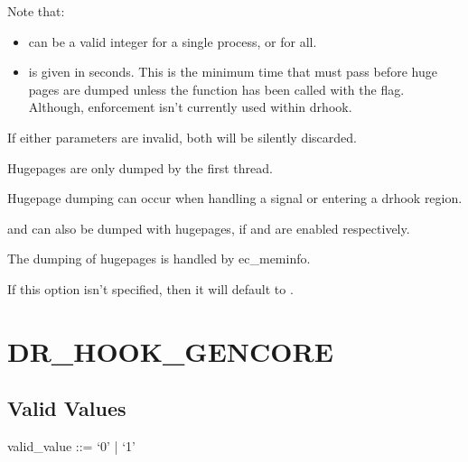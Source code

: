 \documentclass[letterpaper,10pt,english]{sphinxmanual}
\begin{document}
\sphinxAtStartPar
{}

\sphinxAtStartPar
Note that:
\begin{itemize}
\item {} 
\sphinxAtStartPar
{} can be a valid integer for a single process, or  for all.

\item {} 
\sphinxAtStartPar
{} is given in seconds. This is the minimum time that must pass before huge pages are dumped \sphinxhyphen{} unless the function has been called with the  flag. Although, enforcement isn’t currently used within drhook.

\end{itemize}

\sphinxAtStartPar
If either parameters are invalid, both will be silently discarded.

\sphinxAtStartPar
Hugepages are only dumped by the first thread.

\sphinxAtStartPar
Hugepage dumping can occur when handling a signal or entering a drhook region.

\sphinxAtStartPar
{} and  can also be dumped with hugepages, if {\hyperref[\detokenize{flag/flag:dr-hook-dump-buddyinfo}]{}} and {\hyperref[\detokenize{flag/flag:dr-hook-dump-meminfo}]{}} are enabled respectively.

\sphinxAtStartPar
The dumping of hugepages is handled by ec\_meminfo.

\sphinxAtStartPar
If this option isn’t specified, then it will default to .


\section{DR\_HOOK\_GENCORE}
\label{\detokenize{flag/flag:dr-hook-gencore}}\label{\detokenize{flag/flag:id215}}

\subsection{Valid Values}
\label{\detokenize{flag/flag:id216}}
\begin{DUlineblock}{0em}
\item[] valid\_value ::= ‘0’ | ‘1’
\end{DUlineblock}
\end{document}

